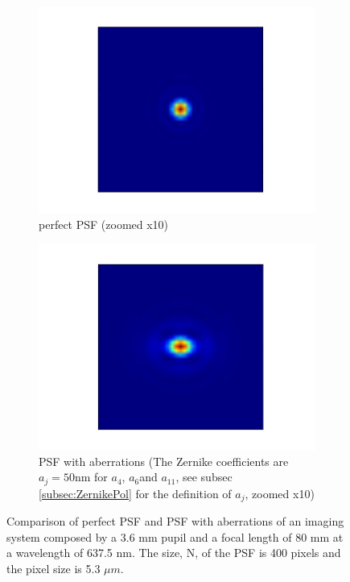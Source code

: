\begin{figure}
 \centering
     \begin{subfigure}{0.45\textwidth}
         \includegraphics[width=\textwidth]{Figures/PSFzoom}
         \caption{perfect PSF (zoomed x10)}
         \label{subfig:perfPSF}
     \end{subfigure}
     \quad
     \begin{subfigure}{0.45\textwidth}
         \includegraphics[width=\textwidth]{Figures/PSFzoomWthAb}
         \caption{PSF with aberrations (The Zernike coefficients are $a_j = 50 \mathrm{nm}$ for $a_{4}$, $a_{6}$and $a_{11}$, see subsec \ref{subsec:ZernikePol} for the definition of $a_j$, zoomed x10)}
         \label{subfig:PSFWthAb}
     \end{subfigure}
     \decoRule
     \caption{Comparison of perfect PSF and PSF with aberrations of an imaging system composed by a 3.6 mm pupil and a focal length of 80 mm at a wavelength of 637.5 nm. The size, N, of the PSF is 400 pixels and the pixel size is 5.3 $\mu m$.}
     \label{fig:ComparisonPSFs}
 \end{figure} 

